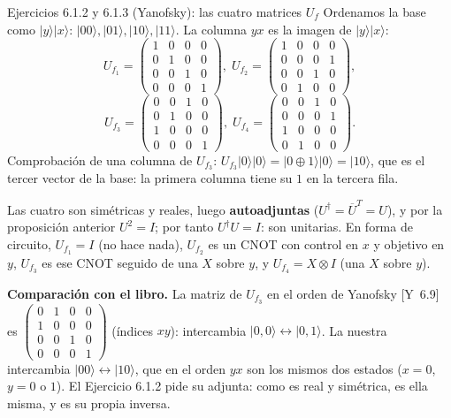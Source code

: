 \documentclass[11pt, a4paper, twoside, openright]{report}
\providecommand{\ket}[1]{|#1\rangle}
\newcommand{\Yan}[1]{\textcolor{rosaviejo}{\small[Y~#1]}}  %
\begin{document}
\begin{ejercicio}{Ejercicios 6.1.2 y 6.1.3 (Yanofsky): las cuatro matrices $U_f$}
Ordenamos la base como $\ket{y}\ket{x}$: $\ket{00}, \ket{01}, \ket{10}, \ket{11}$. La columna $yx$ es la imagen de $\ket{y}\ket{x}$:
\[
U_{f_1} = \begin{pmatrix} 1&0&0&0\\0&1&0&0\\0&0&1&0\\0&0&0&1 \end{pmatrix}\!, \;
U_{f_2} = \begin{pmatrix} 1&0&0&0\\0&0&0&1\\0&0&1&0\\0&1&0&0 \end{pmatrix}\!, \]
\[
U_{f_3} = \begin{pmatrix} 0&0&1&0\\0&1&0&0\\1&0&0&0\\0&0&0&1 \end{pmatrix}\!, \;
U_{f_4} = \begin{pmatrix} 0&0&1&0\\0&0&0&1\\1&0&0&0\\0&1&0&0 \end{pmatrix}\!.
\]
Comprobación de una columna de $U_{f_3}$: $U_{f_3}\ket{0}\ket{0} = \ket{0\oplus 1}\ket{0} = \ket{10}$, que es el tercer vector de la base: la primera columna tiene su $1$ en la tercera fila.

Las cuatro son simétricas y reales, luego \textbf{autoadjuntas} ($U^\dagger = \overline{U}^{T} = U$), y por la proposición anterior $U^2 = I$; por tanto $U^\dagger U = I$: son unitarias. En forma de circuito, $U_{f_1} = I$ (no hace nada), $U_{f_2}$ es un CNOT con control en $x$ y objetivo en $y$, $U_{f_3}$ es ese CNOT seguido de una $X$ sobre $y$, y $U_{f_4} = X\otimes I$ (una $X$ sobre $y$).

\textbf{Comparación con el libro.} La matriz de $U_{f_3}$ en el orden de Yanofsky \Yan{6.9} es
$\left(\begin{smallmatrix} 0&1&0&0\\1&0&0&0\\0&0&1&0\\0&0&0&1 \end{smallmatrix}\right)$ (índices $xy$): intercambia $\ket{0,0}\leftrightarrow\ket{0,1}$. La nuestra intercambia $\ket{00}\leftrightarrow\ket{10}$, que en el orden $yx$ son los mismos dos estados ($x = 0$, $y = 0$ o $1$). El Ejercicio 6.1.2 pide su adjunta: como es real y simétrica, es ella misma, y es su propia inversa.
\end{ejercicio}
\end{document}
